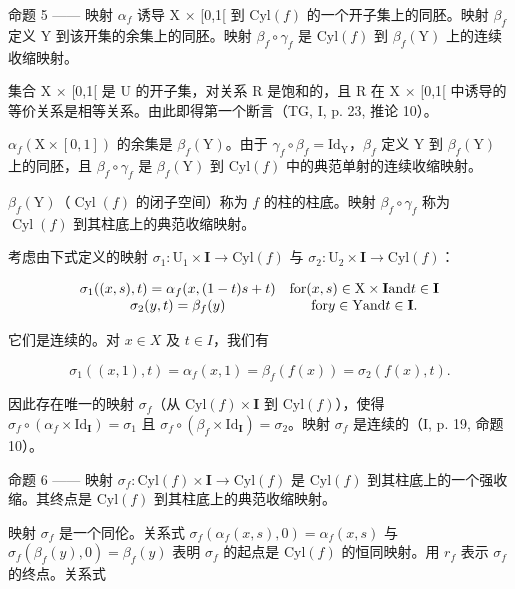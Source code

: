 命题 5 —— 映射 \(\alpha_{f}\) 诱导 X × {[}0,1{[} 到 \(\mathrm{Cyl}(f)\) 的一个开子集上的同胚。映射 \(\beta_{f}\) 定义 Y 到该开集的余集上的同胚。映射 \(\beta_{f} \circ \gamma_{f}\) 是 \(\mathrm{Cyl}(f)\) 到 \(\beta_{f}(\mathrm{Y})\) 上的连续收缩映射。

集合 X × {[}0,1{[} 是 U 的开子集，对关系 R 是饱和的，且 R 在 X × {[}0,1{[} 中诱导的等价关系是相等关系。由此即得第一个断言（TG, I, p. 23, 推论 10）。

\(\alpha_{f}(\mathrm{X}\times[0,1])\) 的余集是 \(\beta_{f}(\mathrm{Y})\)。由于 \(\gamma_{f}\circ\beta_{f}=\mathrm{Id}_{\mathrm{Y}}\)，\(\beta_{f}\) 定义 Y 到 \(\beta_{f}(\mathrm{Y})\) 上的同胚，且 \(\beta_{f}\circ\gamma_{f}\) 是 \(\beta_{f}(\mathrm{Y})\) 到 \(\mathrm{Cyl}(f)\) 中的典范单射的连续收缩映射。

\(\beta_{f}(\mathrm{Y})\)（\(\operatorname{Cyl}(f)\) 的闭子空间）称为 \(f\) 的柱的柱底。映射 \(\beta_{f} \circ \gamma_{f}\) 称为 \(\operatorname{Cyl}(f)\) 到其柱底上的典范收缩映射。

考虑由下式定义的映射 \(\sigma_{1}\colon\mathrm{U}_{1}\times\mathbf{I}\to\mathrm{Cyl}(f)\) 与 \(\sigma_{2}\colon\mathrm{U}_{2}\times\mathbf{I}\to\mathrm{Cyl}(f)\)：

\[
\begin{array}{c c} \sigma_ {1} ((x, s), t) = \alpha_ {f} (x, (1 - t) s + t) & \text {for} (x, s) \in \mathrm{X} \times \mathbf {I} \text {and} t \in \mathbf {I} \\ \sigma_ {2} (y, t) = \beta_ {f} (y) & \text {for} y \in \mathrm{Y} \text {and} t \in \mathbf {I}. \end{array}
\]

它们是连续的。对 \(x \in X\) 及 \(t \in I\)，我们有

\[
\sigma_ {1} ((x, 1), t) = \alpha_ {f} (x, 1) = \beta_ {f} (f (x)) = \sigma_ {2} (f (x), t).
\]

因此存在唯一的映射 \(\sigma_{f}\)（从 \(\mathrm{Cyl}(f)\times\mathbf{I}\) 到 \(\mathrm{Cyl}(f)\)），使得 \(\sigma_{f}\circ(\alpha_{f}\times\mathrm{Id}_{\mathbf{I}})=\sigma_{1}\) 且 \(\sigma_{f}\circ(\beta_{f}\times\mathrm{Id}_{\mathbf{I}})=\sigma_{2}\)。映射 \(\sigma_{f}\) 是连续的（I, p. 19, 命题 10）。

命题 6 —— 映射 \(\sigma_{f}\colon\mathrm{Cyl}(f)\times\mathbf{I}\to\mathrm{Cyl}(f)\) 是 \(\mathrm{Cyl}(f)\) 到其柱底上的一个强收缩。其终点是 \(\mathrm{Cyl}(f)\) 到其柱底上的典范收缩映射。

映射 \(\sigma_f\) 是一个同伦。关系式 \(\sigma_f(\alpha_f(x,s),0) = \alpha_f(x,s)\) 与 \(\sigma_f(\beta_f(y),0) = \beta_f(y)\) 表明 \(\sigma_f\) 的起点是 \(\mathrm{Cyl}(f)\) 的恒同映射。用 \(r_f\) 表示 \(\sigma_f\) 的终点。关系式

